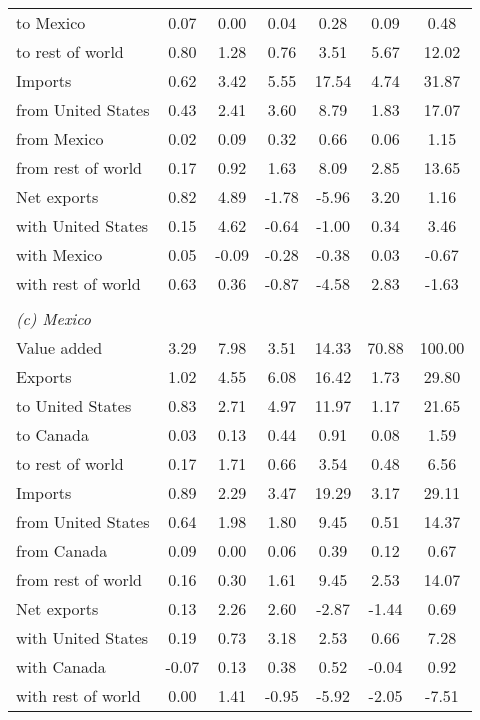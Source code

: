 \begin{table}[p]
\begin{center}
\begin{tabular}{lcccccc}
\quad to Mexico& 0.07& 0.00& 0.04& 0.28& 0.09& 0.48\\
\quad to rest of world& 0.80& 1.28& 0.76& 3.51& 5.67& 12.02\\
Imports& 0.62& 3.42& 5.55& 17.54& 4.74& 31.87\\
\quad from United States& 0.43& 2.41& 3.60& 8.79& 1.83& 17.07\\
\quad from Mexico& 0.02& 0.09& 0.32& 0.66& 0.06& 1.15\\
\quad from rest of world& 0.17& 0.92& 1.63& 8.09& 2.85& 13.65\\
Net exports& 0.82& 4.89& -1.78& -5.96& 3.20& 1.16\\
\quad with United States& 0.15& 4.62& -0.64& -1.00& 0.34& 3.46\\
\quad with Mexico& 0.05& -0.09& -0.28& -0.38& 0.03& -0.67\\
\quad with rest of world& 0.63& 0.36& -0.87& -4.58& 2.83& -1.63\\
\\
\multicolumn{6}{l}{\textit{(c) Mexico}}\\
Value added& 3.29& 7.98& 3.51& 14.33& 70.88& 100.00\\
Exports& 1.02& 4.55& 6.08& 16.42& 1.73& 29.80\\
\quad to United States& 0.83& 2.71& 4.97& 11.97& 1.17& 21.65\\
\quad to Canada& 0.03& 0.13& 0.44& 0.91& 0.08& 1.59\\
\quad to rest of world& 0.17& 1.71& 0.66& 3.54& 0.48& 6.56\\
Imports& 0.89& 2.29& 3.47& 19.29& 3.17& 29.11\\
\quad from United States& 0.64& 1.98& 1.80& 9.45& 0.51& 14.37\\
\quad from Canada& 0.09& 0.00& 0.06& 0.39& 0.12& 0.67\\
\quad from rest of world& 0.16& 0.30& 1.61& 9.45& 2.53& 14.07\\
Net exports& 0.13& 2.26& 2.60& -2.87& -1.44& 0.69\\
\quad with United States& 0.19& 0.73& 3.18& 2.53& 0.66& 7.28\\
\quad with Canada& -0.07& 0.13& 0.38& 0.52& -0.04& 0.92\\
\quad with rest of world& 0.00& 1.41& -0.95& -5.92& -2.05& -7.51\\
\bottomrule
\end{tabular}
\normalsize
\end{center}
\end{table}
